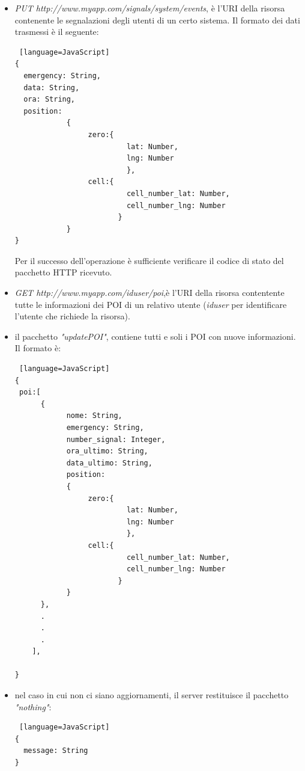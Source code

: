 \begin{itemize}
\item  \textit{PUT http://www.myapp.com/signals/system/events}, è l'URI della risorsa contenente le segnalazioni degli utenti di un certo sistema. Il formato dei dati trasmessi è il seguente:
\begin{lstlisting} [language=JavaScript]
{
  emergency: String,
  data: String,
  ora: String,
  position: 
			{
			     zero:{
			              lat: Number,
			              lng: Number
			              },
			     cell:{
			              cell_number_lat: Number,
			              cell_number_lng: Number
			            }
			}
}
\end{lstlisting}
Per il successo dell'operazione è sufficiente verificare il codice di stato del pacchetto HTTP ricevuto.
\item \textit{GET http://www.myapp.com/iduser/poi},è l'URI della risorsa contentente tutte le informazioni dei POI di un relativo utente (\textit{iduser} per identificare l'utente che richiede la risorsa).
\item il pacchetto \textit{"updatePOI"}, contiene tutti e soli i POI con nuove informazioni. Il formato è:
\begin{lstlisting} [language=JavaScript]
{
 poi:[
	  {
			nome: String,
		    emergency: String,
			number_signal: Integer,
			ora_ultimo: String,
			data_ultimo: String,
			position: 
			{
			     zero:{
			              lat: Number,
			              lng: Number
			              },
			     cell:{
			              cell_number_lat: Number,
			              cell_number_lng: Number
			            }
			}
	  },
	  .
	  .
	  .
	],
  
}
\end{lstlisting}
\item nel caso in cui non ci siano aggiornamenti, il server restituisce il pacchetto \textit{"nothing"}:
\begin{lstlisting} [language=JavaScript]
{
  message: String
}
\end{lstlisting}
\end{itemize}